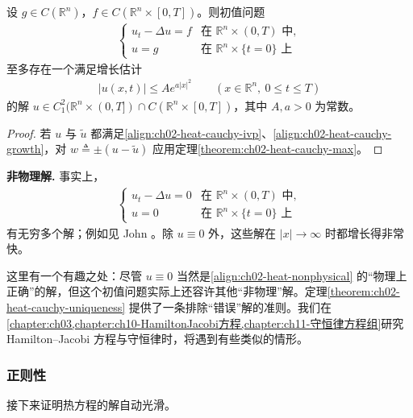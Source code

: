 \documentclass[../../main.tex]{subfiles}
\begin{document}
\begin{theorem}\label{theorem:ch02-heat-cauchy-uniqueness}设 $g\in C(\mathbb{R}^n)$，$f\in C(\mathbb{R}^n\times[0,T])$。则初值问题
\begin{align}\label{align:ch02-heat-cauchy-ivp}
\begin{cases}
u_t-\Delta u=f & \text{在 }\mathbb{R}^n\times(0,T)\text{ 中},\\
u=g & \text{在 }\mathbb{R}^n\times\{t=0\}\text{ 上}
\end{cases}
\end{align}
至多存在一个满足增长估计
\begin{align}\label{align:ch02-heat-cauchy-growth}
|u(x,t)|\leqslant A e^{a|x|^2} \qquad (x\in\mathbb{R}^n,\ 0\leqslant t\leqslant T)
\end{align}
的解 $u\in C^2_1(\mathbb{R}^n\times(0,T])\cap C(\mathbb{R}^n\times[0,T])$，其中 $A,a>0$ 为常数。
\end{theorem}

\begin{proof}
若 $u$ 与 $\widetilde{u}$ 都满足\eqref{align:ch02-heat-cauchy-ivp}、\eqref{align:ch02-heat-cauchy-growth}，对 $w\triangleq\pm(u-\widetilde{u})$ 应用定理\cref{theorem:ch02-heat-cauchy-max}。
\end{proof}

\textbf{非物理解.} 事实上，
\begin{align}\label{align:ch02-heat-nonphysical}
\begin{cases}
u_t-\Delta u=0 & \text{在 }\mathbb{R}^n\times(0,T)\text{ 中},\\
u=0 & \text{在 }\mathbb{R}^n\times\{t=0\}\text{ 上}
\end{cases}
\end{align}
有无穷多个解；例如见 John \cite[Chapter 7]{J2}。除 $u\equiv 0$ 外，这些解在 $|x|\to\infty$ 时都增长得非常快。

这里有一个有趣之处：尽管 $u\equiv 0$ 当然是\eqref{align:ch02-heat-nonphysical} 的``物理上正确''的解，但这个初值问题实际上还容许其他``非物理''解。定理\cref{theorem:ch02-heat-cauchy-uniqueness} 提供了一条排除``错误''解的准则。我们在\cref{chapter:ch03,chapter:ch10-HamiltonJacobi方程,chapter:ch11-守恒律方程组}研究 Hamilton--Jacobi 方程与守恒律时，将遇到有些类似的情形。

\subsubsection{正则性}

接下来证明热方程的解自动光滑。
\end{document}
